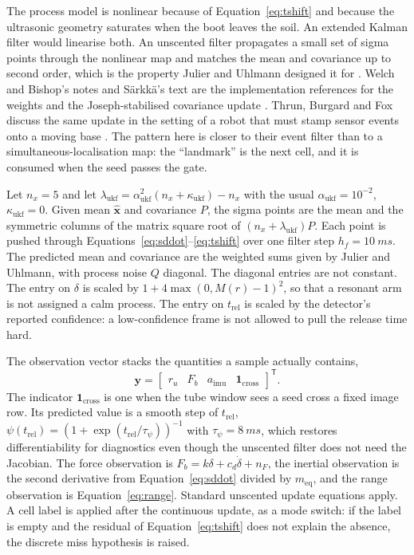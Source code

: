 The process model is nonlinear because of Equation~\eqref{eq:tshift} and because the ultrasonic geometry saturates when the boot leaves the soil. An extended Kalman filter would linearise both. An unscented filter propagates a small set of sigma points through the nonlinear map and matches the mean and covariance up to second order, which is the property Julier and Uhlmann designed it for \cite{julier1997}. Welch and Bishop's notes and S{\"a}rkk{\"a}'s text are the implementation references for the weights and the Joseph-stabilised covariance update \cite{welch2006,sarkka2013}. Thrun, Burgard and Fox discuss the same update in the setting of a robot that must stamp sensor events onto a moving base \cite{thrun2005}. The pattern here is closer to their event filter than to a simultaneous-localisation map: the ``landmark'' is the next cell, and it is consumed when the seed passes the gate.

Let \(n_x=5\) and let \(\lambda_{\mathrm{ukf}}=\alpha_{\mathrm{ukf}}^2(n_x+\kappa_{\mathrm{ukf}})-n_x\) with the usual \(\alpha_{\mathrm{ukf}}=10^{-2}\), \(\kappa_{\mathrm{ukf}}=0\). Given mean \(\hat{\mathbf{x}}\) and covariance \(P\), the sigma points are the mean and the symmetric columns of the matrix square root of \((n_x+\lambda_{\mathrm{ukf}})P\). Each point is pushed through Equations~\eqref{eq:sddot}--\eqref{eq:tshift} over one filter step \(h_f=\SI{10}{ms}\). The predicted mean and covariance are the weighted sums given by Julier and Uhlmann, with process noise \(Q\) diagonal. The diagonal entries are not constant. The entry on \(\delta\) is scaled by \(1+4\max(0, M(r)-1)^2\), so that a resonant arm is not assigned a calm process. The entry on \(t_{\mathrm{rel}}\) is scaled by the detector's reported confidence: a low-confidence frame is not allowed to pull the release time hard.

The observation vector stacks the quantities a sample actually contains,
\begin{equation}
\label{eq:obs}
\mathbf{y} =
\begin{bmatrix}
r_u & F_b & a_{\mathrm{imu}} & \mathbf{1}_{\mathrm{cross}}
\end{bmatrix}^{\mathsf{T}}.
\end{equation}
The indicator \(\mathbf{1}_{\mathrm{cross}}\) is one when the tube window sees a seed cross a fixed image row. Its predicted value is a smooth step of \(t_{\mathrm{rel}}\), \(\psi(t_{\mathrm{rel}})=(1+\exp(t_{\mathrm{rel}}/\tau_{\psi}))^{-1}\) with \(\tau_{\psi}=\SI{8}{ms}\), which restores differentiability for diagnostics even though the unscented filter does not need the Jacobian. The force observation is \(F_b = k\delta + c_d\dot{\delta} + n_F\), the inertial observation is the second derivative from Equation~\eqref{eq:sddot} divided by \(m_{\mathrm{eq}}\), and the range observation is Equation~\eqref{eq:range}. Standard unscented update equations apply. A cell label is applied after the continuous update, as a mode switch: if the label is empty and the residual of Equation~\eqref{eq:tshift} does not explain the absence, the discrete miss hypothesis is raised.

